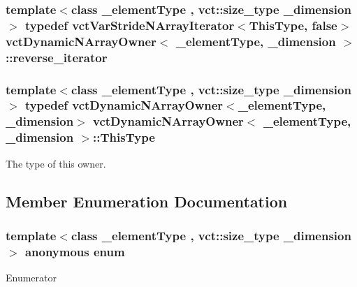 \subsubsection[{reverse\+\_\+iterator}]{\setlength{\rightskip}{0pt plus 5cm}template$<$class \+\_\+element\+Type , vct\+::size\+\_\+type \+\_\+dimension$>$ typedef {\bf vct\+Var\+Stride\+N\+Array\+Iterator}$<${\bf This\+Type}, false$>$ {\bf vct\+Dynamic\+N\+Array\+Owner}$<$ \+\_\+element\+Type, \+\_\+dimension $>$\+::{\bf reverse\+\_\+iterator}}\label{classvct_dynamic_n_array_owner_a9b4b9b8c6f7e3cfe9bdf9aedbdda6f0d}
\hypertarget{classvct_dynamic_n_array_owner_ad221bdc6a1c33632b48777a685da9036}{}
\subsubsection[{This\+Type}]{\setlength{\rightskip}{0pt plus 5cm}template$<$class \+\_\+element\+Type , vct\+::size\+\_\+type \+\_\+dimension$>$ typedef {\bf vct\+Dynamic\+N\+Array\+Owner}$<$\+\_\+element\+Type, \+\_\+dimension$>$ {\bf vct\+Dynamic\+N\+Array\+Owner}$<$ \+\_\+element\+Type, \+\_\+dimension $>$\+::{\bf This\+Type}}\label{classvct_dynamic_n_array_owner_ad221bdc6a1c33632b48777a685da9036}
The type of this owner. 

\subsection{Member Enumeration Documentation}
\hypertarget{classvct_dynamic_n_array_owner_a0f4131a70f9365b60085fd16ce0e2f69}{}\subsubsection[{anonymous enum}]{\setlength{\rightskip}{0pt plus 5cm}template$<$class \+\_\+element\+Type , vct\+::size\+\_\+type \+\_\+dimension$>$ anonymous enum}\label{classvct_dynamic_n_array_owner_a0f4131a70f9365b60085fd16ce0e2f69}
\begin{Desc}
\item[Enumerator]\par
\begin{description}
\item[{\em 
\hypertarget{classvct_dynamic_n_array_owner_a0f4131a70f9365b60085fd16ce0e2f69a095e29919b35ca1549f2ff0d092d9116}{}D\+I\+M\+E\+N\+S\+I\+O\+N\label{classvct_dynamic_n_array_owner_a0f4131a70f9365b60085fd16ce0e2f69a095e29919b35ca1549f2ff0d092d9116}
}]\end{description}
\end{Desc}


